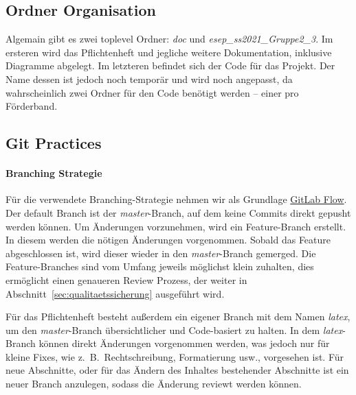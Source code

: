 
\subsection{Ordner Organisation}\label{subsec:organisation}
Algemain gibt es zwei toplevel Ordner: \textit{doc} und \textit{esep\_ss2021\_Gruppe2\_3}.
Im ersteren wird das Pflichtenheft und jegliche weitere Dokumentation, inklusive Diagramme abgelegt.
Im letzteren befindet sich der Code für das Projekt.
Der Name dessen ist jedoch noch temporär und wird noch angepasst,
da wahrscheinlich zwei Ordner für den Code benötigt werden -- einer pro Förderband.

\subsection{Git Practices}\label{subsec:git}

\paragraph{Branching Strategie}
Für die verwendete Branching-Strategie nehmen wir als Grundlage
\href{https://docs.gitlab.com/ee/topics/gitlab_flow.html}{GitLab Flow}.
Der default Branch ist der \textit{master}-Branch, auf dem keine Commits direkt
gepusht werden können.
Um Änderungen vorzunehmen, wird ein Feature-Branch erstellt.
In diesem werden die nötigen Änderungen vorgenommen.
Sobald das Feature abgeschlossen ist, wird dieser wieder in den \textit{master}-Branch gemerged.
Die Feature-Branches sind vom Umfang jeweils möglichst klein zuhalten, dies ermöglicht einen
genaueren Review Prozess, der weiter in Abschnitt~\ref{sec:qualitaetssicherung} ausgeführt wird.

Für das Pflichtenheft besteht außerdem ein eigener Branch mit dem Namen \textit{latex}, um den
\textit{master}-Branch übersichtlicher und Code-basiert zu halten.
In dem \textit{latex}-Branch können direkt Änderungen vorgenommen werden, was jedoch nur für kleine Fixes, wie
z.\ B.\ Rechtschreibung, Formatierung usw., vorgesehen ist.
Für neue Abschnitte, oder für das Ändern des Inhaltes bestehender Abschnitte ist ein neuer Branch
anzulegen, sodass die Änderung reviewt werden können.

